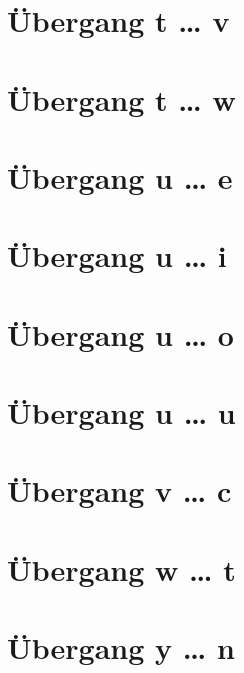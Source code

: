 \documentclass[a4paper,landscape]{article}
\begin{document}
\hspace*{-1ex}
\newpage

\section{Übergang t … v }

\hspace*{-1ex}
\newpage

\section{Übergang t … w }

\hspace*{-1ex}
\newpage

\section{Übergang u … e }

\hspace*{-1ex}
\newpage

\section{Übergang u … i }

\hspace*{-1ex}
\newpage

\section{Übergang u … o }

\hspace*{-1ex}
\newpage


\section{Übergang u … u }

\hspace*{-1ex}
\newpage

\section{Übergang v … c }

\hspace*{-1ex}
\newpage

\section{Übergang w … t }

\hspace*{-1ex}
\newpage

\section{Übergang y … n }

\hspace*{-1ex}
\newpage
\end{document}
